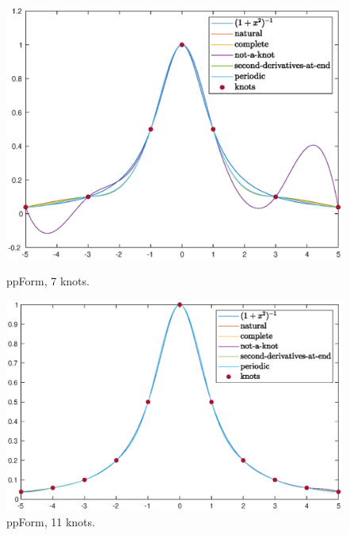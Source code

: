 \documentclass[11pt,en]{elegantpaper}
\begin{document}
\begin{figure}[htbp]
    \begin{minipage}[t]{0.5\linewidth}
        \centering
        \includegraphics[width=0.9\linewidth]{figure/ppForm_7knots.eps}
        \caption{ppForm, 7 knots.}
        \label{fig:side:a}
    \end{minipage}%
    \begin{minipage}[t]{0.5\linewidth}
        \centering
        \includegraphics[width=0.9\linewidth]{figure/ppForm_11knots.eps}
        \caption{ppForm, 11 knots.}
        \label{fig:side:b}
    \end{minipage}


\end{figure}
\end{document}
